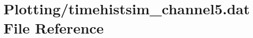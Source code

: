 \hypertarget{Plotting_2timehistsim__channel5_8dat}{}\section{Plotting/timehistsim\+\_\+channel5.dat File Reference}
\label{Plotting_2timehistsim__channel5_8dat}
